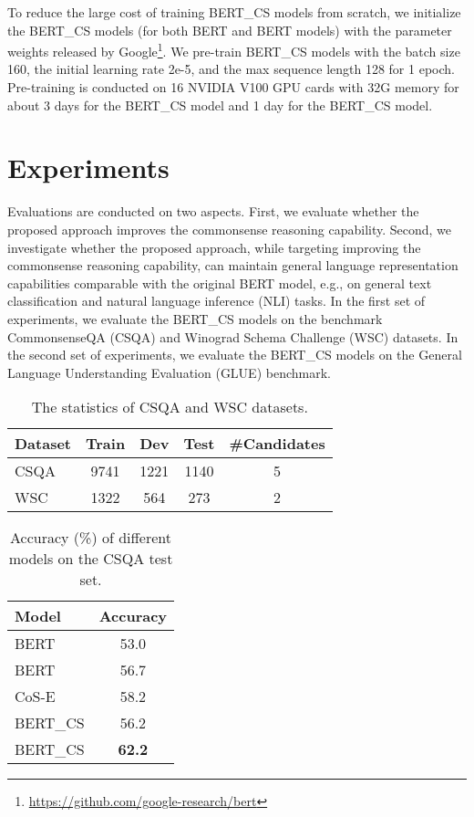 \documentclass[11pt,a4paper]{article}
\begin{document}
To reduce the large cost of training BERT\_CS models from scratch, we initialize the BERT\_CS models (for both BERT and BERT models) with the parameter weights released by Google\footnote{\url{https://github.com/google-research/bert}}.
We pre-train BERT\_CS models with the batch size 160, the initial learning rate 2e-5, and the max sequence length 128 for 1 epoch. Pre-training is conducted on 16 NVIDIA V100 GPU cards with 32G memory for about 3 days for the BERT\_CS model and 1 day for the BERT\_CS model.

\section{Experiments}
\label{sect:expts}
Evaluations are conducted on two aspects. First, we evaluate whether the proposed approach improves the commonsense reasoning capability. Second, we investigate whether the proposed approach, while targeting improving the commonsense reasoning capability, can maintain general language representation capabilities comparable with the original BERT model, e.g., on general text classification and natural language inference (NLI) tasks. 
In the first set of experiments, we evaluate the BERT\_CS models on the benchmark CommonsenseQA (CSQA) and Winograd Schema Challenge (WSC) datasets. In the second set of experiments, we evaluate the BERT\_CS models on the General Language Understanding Evaluation (GLUE) benchmark.

\begin{table}[t!]
	\begin{center}
		\small
		\begin{tabular}{p{1.2cm}|c|c|c|c}
			\toprule
			\textbf{Dataset}             & \textbf{Train} & \textbf{Dev} & \textbf{Test} & \textbf{\#Candidates} \\
			\midrule
			CSQA       & 9741    & 1221  & 1140  & 5  \\ 
			\midrule
			WSC        & 1322    &  564  & 273   & 2  \\
			\bottomrule
		\end{tabular}
	\end{center}
	\caption{The statistics of CSQA and WSC datasets.}
	\label{dataset}
\end{table}

\begin{table}[t!]
	\begin{center}
		\small
		\begin{tabular}{p{3.8cm}|c}
			\toprule
			\textbf{Model}             & \textbf{Accuracy}  \\
			\midrule
			BERT     & 53.0     \\
			\midrule
			BERT & 56.7 \\
			\midrule
			CoS-E \citep{rajani2019explain} & 58.2 \\
			\bottomrule
			\toprule
			BERT\_CS  & 56.2   \\
			\midrule
			BERT\_CS   & \textbf{62.2}   \\
			\bottomrule
		\end{tabular}
	\end{center}
	\caption{Accuracy (\%) of different models on the CSQA test set.}
	\label{tab:CSQA_results}
\end{table}
\end{document}
